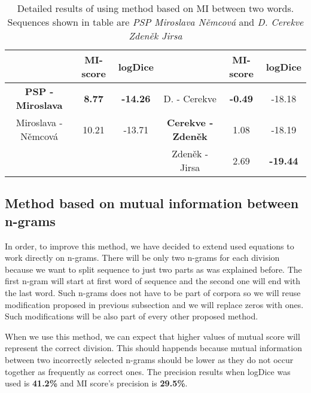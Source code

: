 \documentclass[runningheads]{llncs}
\begin{document}
\begin{table}[h] 
\caption{Detailed results of using method based on MI between two
words. Sequences shown in table are {\em PSP
Miroslava N\v{e}mcov\'{a}} and {\em D. Cerekve Zden\v{e}k Jirsa}}
\label{mutual-two-words}
\begin{center} \begin{tabular}{|c|c|c|c|c|c|} \hline
 & MI-score & logDice & & MI-score & logDice \\ \hline
{\bf PSP - Miroslava} & {\bf 8.77} & {\bf -14.26} & D. - Cerekve & {\bf -0.49} & -18.18 \\ \hline
Miroslava - N\v{e}mcov\'{a} & 10.21 & -13.71 & {\bf Cerekve - Zden\v{e}k} & 1.08 & -18.19 \\ \hline
 &  &  & Zden\v{e}k - Jirsa & 2.69 & {\bf -19.44} \\ \hline
\end{tabular} \end{center} \end{table}

\subsection{Method based on mutual information between n-grams}

In order, to improve this method, we have decided to extend used equations
to work directly on n-grams. There will be only two n-grams for each
division because we want to split sequence to just two parts as was
explained before. The first n-gram will start at first word of sequence and
the second one will end with the last word. Such n-grams does not have to be
part of corpora so we will reuse modification proposed in previous
subsection and we will replace zeros with ones. Such modifications will be
also part of every other proposed method.

When we use this method, we can expect that higher values of mutual score
will represent the correct division. This should happends because mutual
information between two incorrectly selected n-grams should be lower as they
do not occur together as frequently as correct ones. The precision results
when logDice was used is {\bf 41.2\%} and MI score's precision is {\bf
29.5\%}.
\end{document}
